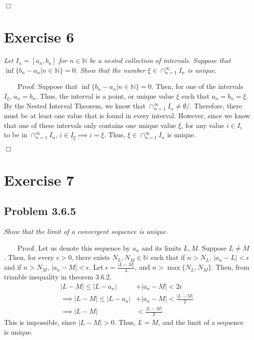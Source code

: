 \documentclass[
]{article}
\begin{document}
\hfill \(\Box\)

\hypertarget{exercise-6}{%
\section{Exercise 6}\label{exercise-6}}

\emph{Let \(I_n = [a_n, b_n]\) for \(n \in \mathbb{N}\) be a nested
collection of intervals. Suppose that
\(\inf \{b_n - a_n|n\in \mathbb{N}\} = 0\). Show that the number
\(\xi \in \cap^{\infty}_{n=1} I_n\) is unique.}

~~~~Proof. Suppose that \(\inf \{b_n - a_n|n\in \mathbb{N}\} = 0\).
Then, for one of the intervals \(I_\xi\), \(a_n = b_n\). Thus, the
interval is a point, or unique value \(\xi\) such that
\(a_n = b_n = \xi\). By the Nested Interval Theorem, we know that
\(\cap^{\infty}_{n=1} I_n \neq \emptyset\)/. Therefore, there must be at
least one value that is found in every interval. However, since we know
that one of these intervals only contains one unique value \(\xi\), for
any value \(i \in I_i\) to be in \(\cap^{\infty}_{n=1} I_n\),
\(i \in I_\xi \implies i = \xi\). Thus,
\(\xi \in \cap^{\infty}_{n=1} I_n\) is unique.

\hfill \(\Box\)

\hypertarget{exercise-7}{%
\section{Exercise 7}\label{exercise-7}}

\hypertarget{problem-3.6.5}{%
\subsection{Problem 3.6.5}\label{problem-3.6.5}}

\emph{Show that the limit of a convergent sequence is unique.}

~~~~Proof. Let us denote this sequence by \(a_n\) and its limits
\(L, M\). Suppose \(L \neq M\). Then, for every \(\epsilon >0\), there
exists \(N_L, N_M \in \mathbb{N}\) such that if \(n > N_L\),
\(|a_n - L| < \epsilon\) and if \(n > N_M\), \(|a_n - M| < \epsilon\).
Let \(\epsilon = \frac{|L - M|}{4}\), and \(n > \max \{N_L, N_M\}\).
Then, from trianble inequality in theorem 3.6.2,\\
\[\begin{aligned} |L - M| \leq |L - a_n| &+ |a_n - M| < 2 \epsilon 
\\ \implies |L - M| \leq |L - a_n| &+ |a_n - M| < \frac{|L - M|}{2} 
\\ \implies |L - M| &< \frac{|L - M|}{2} \end{aligned}\] This is
impossible, since \(|L - M| > 0\). Thus, \(L = M\), and the limit of a
sequence is unique.
\end{document}
